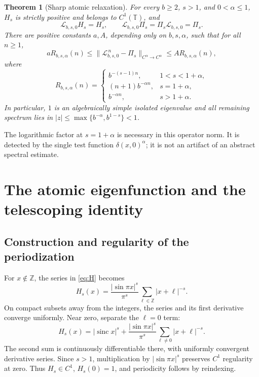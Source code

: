 \documentclass[11pt,a4paper]{article}
\numberwithin{equation}{section}
\newtheorem{theorem}{Theorem}[section]
\theoremstyle{definition}
\theoremstyle{remark}
\newcommand{\TT}{\mathbb T}
\newcommand{\ZZ}{\mathbb Z}
\newcommand{\Lop}{\mathcal L}
\newcommand{\Proj}{\Pi}
\newcommand{\sinc}{\operatorname{sinc}}
\begin{document}
\begin{theorem}[Sharp atomic relaxation]
\label{thm:relax}
For every $b\ge2$, $s>1$, and $0<\alpha\le1$, $H_s$ is strictly
positive and belongs to $C^1(\TT)$, and
\begin{equation}
 \Lop_{b,s,0}H_s=H_s,\qquad
 \Lop_{b,s,0}\Proj_s=\Proj_s\Lop_{b,s,0}=\Proj_s.
\end{equation}
There are positive constants $a,A$, depending only on $b,s,\alpha$, such
that for all $n\ge1$,
\begin{equation}
 aR_{b,s,\alpha}(n)\le
 \|\Lop_{b,s,0}^{\,n}-\Proj_s\|_{C^\alpha\to C^\alpha}
 \le AR_{b,s,\alpha}(n),
 \label{eq:sharp-relax}
\end{equation}
where
\begin{equation}
 R_{b,s,\alpha}(n)=
 \begin{cases}
 b^{-(s-1)n},&1<s<1+\alpha,\\
 (n+1)b^{-\alpha n},&s=1+\alpha,\\
 b^{-\alpha n},&s>1+\alpha.
 \end{cases}
 \label{eq:rate}
\end{equation}
In particular, $1$ is an algebraically simple isolated eigenvalue and all
remaining spectrum lies in
$|z|\le\max\{b^{-\alpha},b^{1-s}\}<1$.
\end{theorem}

The logarithmic factor at $s=1+\alpha$ is necessary in this operator norm.
It is detected by the single test function $\delta(x,0)^\alpha$; it is
not an artifact of an abstract spectral estimate.

\section{The atomic eigenfunction and the telescoping identity}
\label{sec:atomic}

\subsection{Construction and regularity of the periodization}
For $x\notin\ZZ$, the series in \cref{eq:H} becomes
\begin{equation}
 H_s(x)=\frac{|\sin\pi x|^s}{\pi^s}
 \sum_{\ell\in\ZZ}|x+\ell|^{-s}.
 \label{eq:Hsum}
\end{equation}
On compact subsets away from the integers, the series and its first
derivative converge uniformly. Near zero, separate the $\ell=0$ term:
\begin{equation}
 H_s(x)=|\sinc x|^s+
 \frac{|\sin\pi x|^s}{\pi^s}
 \sum_{\ell\ne0}|x+\ell|^{-s}.
 \label{eq:Hsplit}
\end{equation}
The second sum is continuously differentiable there, with uniformly
convergent derivative series. Since $s>1$, multiplication by
$|\sin\pi x|^s$ preserves $C^1$ regularity at zero. Thus $H_s\in C^1$,
$H_s(0)=1$, and periodicity follows by reindexing.
\end{document}
